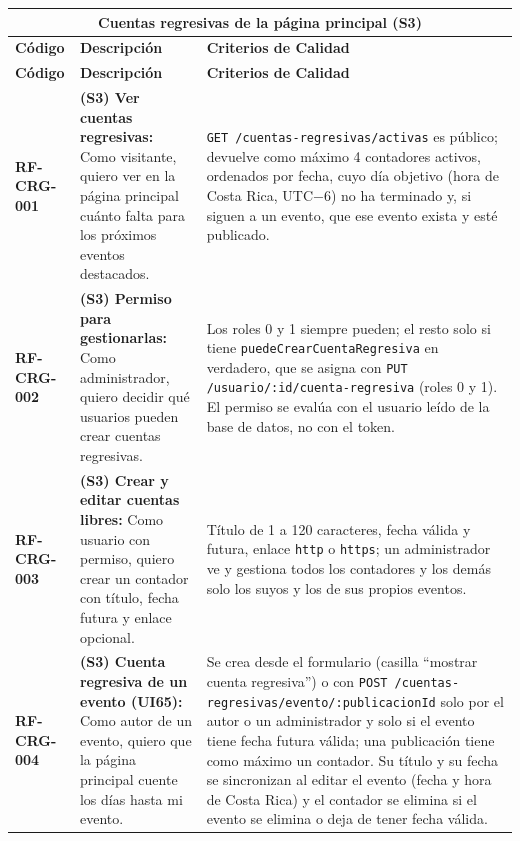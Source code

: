 \begin{longtable}{|l||p{7cm}|p{4.5cm}|}

\multicolumn{3}{c}{Cuentas regresivas de la página principal (S3)}\\
\hline\hline
\textbf{Código} & \textbf{Descripción} & \textbf{Criterios de Calidad}\\
\hline
\endfirsthead
\textbf{Código} & \textbf{Descripción} & \textbf{Criterios de Calidad}\\
\hline\hline
\endhead

\textbf{RF-CRG-001} & \textbf{(S3) Ver cuentas regresivas:} Como visitante, quiero ver en la página principal cuánto falta para los próximos eventos destacados. & \texttt{GET /cuentas-regresivas/activas} es público; devuelve como máximo 4 contadores activos, ordenados por fecha, cuyo día objetivo (hora de Costa Rica, UTC$-6$) no ha terminado y, si siguen a un evento, que ese evento exista y esté publicado. \\
\hline
\textbf{RF-CRG-002} & \textbf{(S3) Permiso para gestionarlas:} Como administrador, quiero decidir qué usuarios pueden crear cuentas regresivas. & Los roles 0 y 1 siempre pueden; el resto solo si tiene \texttt{puedeCrearCuentaRegresiva} en verdadero, que se asigna con \texttt{PUT /usuario/:id/cuenta-regresiva} (roles 0 y 1). El permiso se evalúa con el usuario leído de la base de datos, no con el token. \\
\hline
\textbf{RF-CRG-003} & \textbf{(S3) Crear y editar cuentas libres:} Como usuario con permiso, quiero crear un contador con título, fecha futura y enlace opcional. & Título de 1 a 120 caracteres, fecha válida y futura, enlace \texttt{http} o \texttt{https}; un administrador ve y gestiona todos los contadores y los demás solo los suyos y los de sus propios eventos. \\
\hline
\textbf{RF-CRG-004} & \textbf{(S3) Cuenta regresiva de un evento (UI65):} Como autor de un evento, quiero que la página principal cuente los días hasta mi evento. & Se crea desde el formulario (casilla ``mostrar cuenta regresiva'') o con \texttt{POST /cuentas-regresivas/evento/:publicacionId} solo por el autor o un administrador y solo si el evento tiene fecha futura válida; una publicación tiene como máximo un contador. Su título y su fecha se sincronizan al editar el evento (fecha y hora de Costa Rica) y el contador se elimina si el evento se elimina o deja de tener fecha válida. \\
\hline
\end{longtable}

